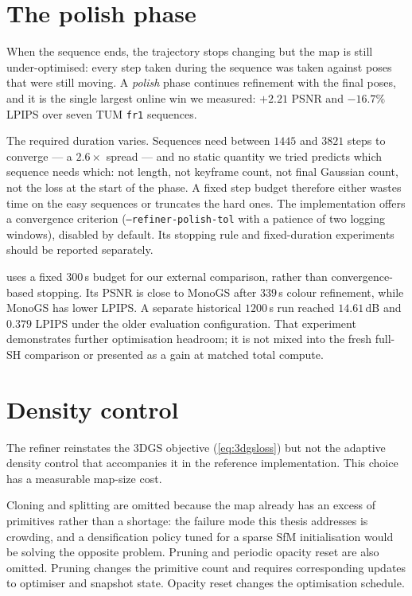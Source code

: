 \section{The polish phase}
\label{sec:refiner:polish}

When the sequence ends, the trajectory stops changing but the map is still
under-optimised: every step taken during the sequence was taken against poses
that were still moving. A \emph{polish} phase continues refinement with the
final poses, and it is the single largest online win we measured:
$+2.21$\dB{} PSNR and $-16.7\%$ LPIPS over seven TUM \texttt{fr1} sequences.

The required duration varies. Sequences need
between $1445$ and $3821$ steps to converge --- a $2.6\times$ spread --- and no
static quantity we tried predicts which sequence needs which: not length, not
keyframe count, not final Gaussian count, not the loss at the start of the
phase. A fixed step budget therefore either wastes time on the easy sequences
or truncates the hard ones. The implementation offers a convergence
criterion (\texttt{--refiner-polish-tol} with a patience of two logging
windows), disabled by default. Its stopping rule and fixed-duration
experiments should be reported separately.

 uses a fixed $300$\,s budget for our external comparison,
rather than convergence-based stopping. Its PSNR is close to MonoGS after
$339$\,s colour refinement, while MonoGS has lower LPIPS. A separate
historical $1200$\,s run reached $14.61$\,dB and $0.379$ LPIPS under the
older evaluation configuration. That experiment demonstrates further
optimisation headroom; it is not mixed into the fresh full-SH comparison or
presented as a gain at matched total compute.

\section{Density control}
\label{sec:refiner:omissions}

The refiner reinstates the 3DGS objective (\cref{eq:3dgsloss}) but not the
adaptive density control that accompanies it in the reference implementation.
This choice has a measurable map-size cost.

Cloning and splitting are omitted because the map already has an excess of
primitives rather than a shortage: the failure mode this thesis addresses is
crowding, and a densification policy tuned for a sparse SfM initialisation
would be solving the opposite problem. Pruning and periodic opacity reset
are also omitted. Pruning changes the primitive count and requires
corresponding updates to optimiser and snapshot state. Opacity reset changes
the optimisation schedule.

